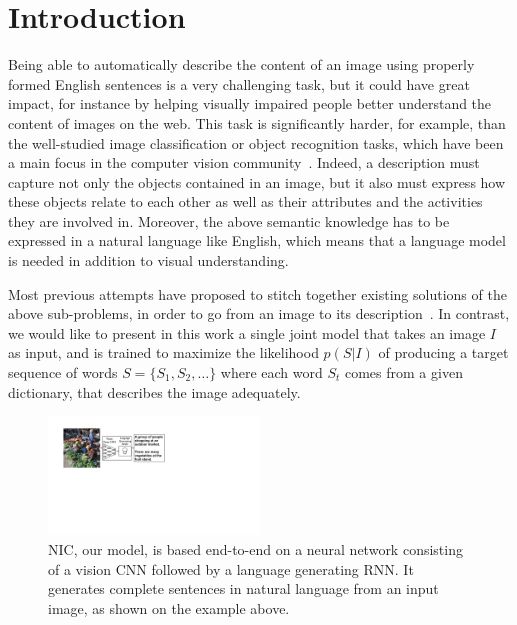 \section{Introduction}
\label{sec:intro}

Being able to automatically describe the content of an image using properly
formed English sentences is a very challenging task, but it could have great
impact, for instance by helping visually impaired people better understand the
content of images on the web. This task is significantly harder, for example, than the
well-studied image classification or object recognition tasks,
which have been a main focus in the computer vision community~\cite{ILSVRCarxiv14}.
Indeed, a description must capture not only the objects contained in an image, but
it also must express how these objects relate to each other as
well as their attributes and the activities they are involved in. Moreover, the above
semantic knowledge has to be expressed in a natural language like English, which
means that a language model is needed in addition to visual understanding.

Most previous attempts have proposed
to stitch together existing solutions of the above sub-problems, in order to go from
an image to its description~\cite{farhadi2010every,kulkarni2011baby}. In contrast, we would like to 
present in this work a single joint model that
takes an image $I$ as input, and is trained to maximize the likelihood
$p(S|I)$ of producing a target sequence of words $S = \{S_1, S_2, \ldots\}$
where each word $S_t$ comes from a given dictionary, that describes the image
adequately.

\begin{figure}
\begin{center}
\includegraphics[width=0.5\textwidth]{overview_fig_2.pdf}
\end{center}
\caption{\label{fig:overview} NIC, our model, is based end-to-end on a neural network consisting of a vision CNN followed by a language generating RNN. It generates complete sentences in natural language from an input image, as shown on the example above.}
\end{figure}


